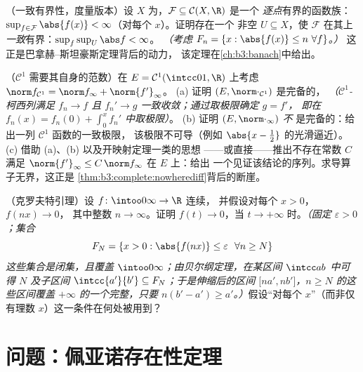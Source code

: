 \begin{exercise}[$\star\star\star$]\label{exo:b3:complete:10}
（一致有界性，度量版本）设 $X$ 为，$\mathcal F \subseteq \mathcal C(X, \R)$ 是一个
\emph{逐点}有界的函数族：$\sup_{f \in \mathcal
F}\abs{f(x)} < \infty$（对每个 $x$）。证明存在一个
非空 $U \subseteq X$，使 $\mathcal F$ 在其上
\emph{一致}有界：$\sup_{f}\sup_U \abs f < \infty$。
\emph{（考虑 $F_n = \{x : \abs{f(x)} \leq n\ \forall f\}$。）}
这正是巴拿赫–斯坦豪斯定理背后的动力，
该定理在\cref{ch:b3:banach}中给出。
\end{exercise}

\begin{exercise}[$\star\star$]\label{exo:b3:complete:11}
（$\mathcal C^1$ 需要其自身的范数）在 $E = \mathcal
C^1(\intcc01, \R)$ 上考虑 $\norm f_{\mathcal C^1} = \norm
f_\infty + \norm{f'}_\infty$。
(a) 证明 $(E, \norm\cdot_{\mathcal C^1})$ 是完备的，
\emph{（$\mathcal C^1$-柯西列满足 $f_n \to f$ 且
$f_n' \to g$ 一致收敛；通过取极限确定 $g = f'$，
即在 $f_n(x) = f_n(0) + \int_0^xf_n'$ 中取极限）}。
(b) 证明 $(E, \norm\cdot_\infty)$ \emph{不}
是完备的：给出一列 $\mathcal C^1$ 函数的一致极限，
该极限不可导（例如
$\abs{x - \tfrac12}$ 的光滑逼近）。
(c) 借助 (a)、(b) 以及开映射定理一类的思想
——或直接——推出不存在常数 $C$ 满足
$\norm{f'}_\infty \leq C\,\norm f_\infty$ 在 $E$ 上：给出
一个见证该结论的序列。求导算子无界，这正是
\cref{thm:b3:complete:nowherediff}背后的断崖。
\end{exercise}

\begin{exercise}[$\star\star\star$]\label{exo:b3:complete:12}
（克罗夫特引理）设 $f\colon\intoo0\infty\to\R$ 连续，
并假设对每个 $x > 0$，$f(nx) \to 0$，
其中整数 $n \to \infty$。证明 $f(t) \to 0$，当 $t \to
+\infty$ 时。\emph{（固定 $\varepsilon > 0$；集合
\[
F_N = \{x > 0 : \abs{f(nx)} \leq \varepsilon\ \ \forall n
\geq N\}
\]
这些集合是闭集，且覆盖 $\intoo0\infty$；由贝尔纲定理，在某区间
$\intcc ab$ 中可得 $N$ 及子区间 $\intcc{a'}{b'}
\subseteq F_N$；于是伸缩后的区间 $\bigl[na', nb'\bigr]$，$n
\geq N$ 的这些区间覆盖 $+\infty$ 的一个完整，只要
$n(b' - a') \geq a'$。）}假设“对每个
$x$”（而非仅有理数 $x$）这一条件在何处被用到？
\end{exercise}

\section{问题：佩亚诺存在性定理}

